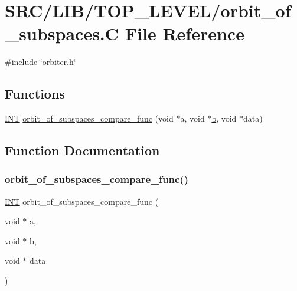 \hypertarget{orbit__of__subspaces_8_c}{}\section{S\+R\+C/\+L\+I\+B/\+T\+O\+P\+\_\+\+L\+E\+V\+E\+L/orbit\+\_\+of\+\_\+subspaces.C File Reference}
\label{orbit__of__subspaces_8_c}
{\ttfamily \#include \char`\"{}orbiter.\+h\char`\"{}}\newline
\subsection*{Functions}
\begin{DoxyCompactItemize}
\item 
\mbox{\hyperlink{galois_8h_a09fddde158a3a20bd2dcadb609de11dc}{I\+NT}} \mbox{\hyperlink{orbit__of__subspaces_8_c_a05ba8b7962f347724c63d56ea731d209}{orbit\+\_\+of\+\_\+subspaces\+\_\+compare\+\_\+func}} (void $\ast$a, void $\ast$\mbox{\hyperlink{alphabet2_8_c_a148e3876077787926724625411d6e7a9}{b}}, void $\ast$data)
\end{DoxyCompactItemize}


\subsection{Function Documentation}
\mbox{\label{orbit__of__subspaces_8_c_a05ba8b7962f347724c63d56ea731d209}} 
\subsubsection{\texorpdfstring{orbit\+\_\+of\+\_\+subspaces\+\_\+compare\+\_\+func()}{orbit\_of\_subspaces\_compare\_func()}}
{\footnotesize\ttfamily \mbox{\hyperlink{galois_8h_a09fddde158a3a20bd2dcadb609de11dc}{I\+NT}} orbit\+\_\+of\+\_\+subspaces\+\_\+compare\+\_\+func (\begin{DoxyParamCaption}\item[{void $\ast$}]{a,  }\item[{void $\ast$}]{b,  }\item[{void $\ast$}]{data }\end{DoxyParamCaption})}

